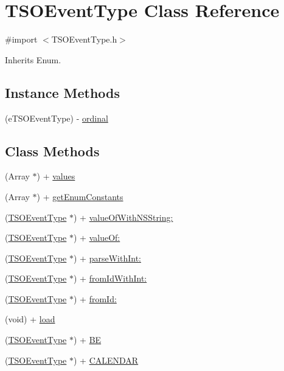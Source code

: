 \hypertarget{interface_t_s_o_event_type}{}\section{T\+S\+O\+Event\+Type Class Reference}
\label{interface_t_s_o_event_type}


{\ttfamily \#import $<$T\+S\+O\+Event\+Type.\+h$>$}



Inherits Enum.

\subsection*{Instance Methods}
\begin{DoxyCompactItemize}
\item 
(e\+T\+S\+O\+Event\+Type) -\/ \hyperlink{interface_t_s_o_event_type_a9a7255fba03807916fe7e88807007a05}{ordinal}
\end{DoxyCompactItemize}
\subsection*{Class Methods}
\begin{DoxyCompactItemize}
\item 
(Array $\ast$) + \hyperlink{interface_t_s_o_event_type_ab1f30b37ab3c11ed8c2882584e87402d}{values}
\item 
(Array $\ast$) + \hyperlink{interface_t_s_o_event_type_a52e579bb53ee92104d9c8338bbf00e46}{get\+Enum\+Constants}
\item 
(\hyperlink{interface_t_s_o_event_type}{T\+S\+O\+Event\+Type} $\ast$) + \hyperlink{interface_t_s_o_event_type_a3d372a54e773823819f47339cde93426}{value\+Of\+With\+N\+S\+String\+:}
\item 
(\hyperlink{interface_t_s_o_event_type}{T\+S\+O\+Event\+Type} $\ast$) + \hyperlink{interface_t_s_o_event_type_a4ec039021f20c21619669df1078baf7b}{value\+Of\+:}
\item 
(\hyperlink{interface_t_s_o_event_type}{T\+S\+O\+Event\+Type} $\ast$) + \hyperlink{interface_t_s_o_event_type_a2661d5a720b5a9b6bb681770ede5ba34}{parse\+With\+Int\+:}
\item 
(\hyperlink{interface_t_s_o_event_type}{T\+S\+O\+Event\+Type} $\ast$) + \hyperlink{interface_t_s_o_event_type_ae70a8c8618af4b46dc5c3e8a9364ffca}{from\+Id\+With\+Int\+:}
\item 
(\hyperlink{interface_t_s_o_event_type}{T\+S\+O\+Event\+Type} $\ast$) + \hyperlink{interface_t_s_o_event_type_a05cba97c2df11122d1155eb4936e7013}{from\+Id\+:}
\item 
(void) + \hyperlink{interface_t_s_o_event_type_abcd6d30b759ce1672fe8e2acbeccf661}{load}
\item 
(\hyperlink{interface_t_s_o_event_type}{T\+S\+O\+Event\+Type} $\ast$) + \hyperlink{interface_t_s_o_event_type_a1fdf9965cf3ec1768160b140c3e9b4cb}{B\+E}
\item 
(\hyperlink{interface_t_s_o_event_type}{T\+S\+O\+Event\+Type} $\ast$) + \hyperlink{interface_t_s_o_event_type_af7dd1785b03b0c306fc0765c6fe5ea7e}{C\+A\+L\+E\+N\+D\+A\+R}
\end{DoxyCompactItemize}


